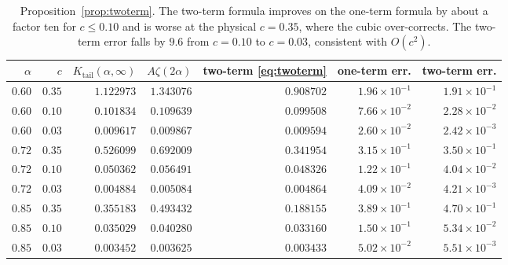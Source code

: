 \documentclass[11pt,reqno]{amsart}
\theoremstyle{plain}
\theoremstyle{definition}
\theoremstyle{remark}
\numberwithin{equation}{section}
\newcommand{\Kt}{K_{\mathrm{tail}}}
\begin{document}
\begin{table}[ht]
\centering\footnotesize\setlength{\tabcolsep}{5pt}
\caption{Proposition~\ref{prop:twoterm}. The two-term formula improves on the one-term formula by about a factor ten for $c\le0.10$ and is worse at the physical $c=0.35$, where the cubic over-corrects. The two-term error falls by $9.6$ from $c=0.10$ to $c=0.03$, consistent with $O(c^2)$.}
\label{tab:twoterm}
\begin{tabular}{@{}r r r r r r r@{}}
\toprule
$\alpha$ & $c$ & $\Kt(\alpha,\infty)$ & $A\zeta(2\alpha)$ & two-term \eqref{eq:twoterm} & one-term err. & two-term err.\\
\midrule
$0.60$ & $0.35$ & $1.122973$ & $1.343076$ & $0.908702$ & $1.96 \times 10^{-1}$ & $1.91 \times 10^{-1}$\\
$0.60$ & $0.10$ & $0.101834$ & $0.109639$ & $0.099508$ & $7.66 \times 10^{-2}$ & $2.28 \times 10^{-2}$\\
$0.60$ & $0.03$ & $0.009617$ & $0.009867$ & $0.009594$ & $2.60 \times 10^{-2}$ & $2.42 \times 10^{-3}$\\
$0.72$ & $0.35$ & $0.526099$ & $0.692009$ & $0.341954$ & $3.15 \times 10^{-1}$ & $3.50 \times 10^{-1}$\\
$0.72$ & $0.10$ & $0.050362$ & $0.056491$ & $0.048326$ & $1.22 \times 10^{-1}$ & $4.04 \times 10^{-2}$\\
$0.72$ & $0.03$ & $0.004884$ & $0.005084$ & $0.004864$ & $4.09 \times 10^{-2}$ & $4.21 \times 10^{-3}$\\
$0.85$ & $0.35$ & $0.355183$ & $0.493432$ & $0.188155$ & $3.89 \times 10^{-1}$ & $4.70 \times 10^{-1}$\\
$0.85$ & $0.10$ & $0.035029$ & $0.040280$ & $0.033160$ & $1.50 \times 10^{-1}$ & $5.34 \times 10^{-2}$\\
$0.85$ & $0.03$ & $0.003452$ & $0.003625$ & $0.003433$ & $5.02 \times 10^{-2}$ & $5.51 \times 10^{-3}$\\
\bottomrule
\end{tabular}
\end{table}
\end{document}
